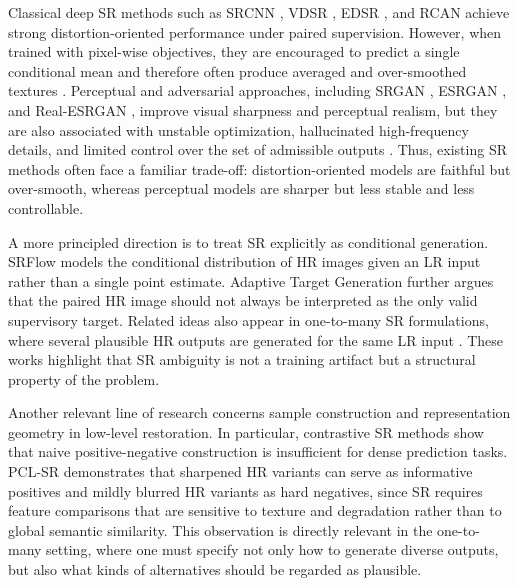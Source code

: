 \documentclass{article}
\begin{document}
Classical deep SR methods such as SRCNN \cite{dong2015srcnn}, VDSR \cite{kim2016vdsr}, EDSR \cite{lim2017edsr}, and RCAN \cite{zhang2018rcan} achieve strong distortion-oriented performance under paired supervision. However, when trained with pixel-wise objectives, they are encouraged to predict a single conditional mean and therefore often produce averaged and over-smoothed textures \cite{ledig2017srgan,wang2018esrgan,jo2021adatarget}. Perceptual and adversarial approaches, including SRGAN \cite{ledig2017srgan}, ESRGAN \cite{wang2018esrgan}, and Real-ESRGAN \cite{wang2021realesrgan}, improve visual sharpness and perceptual realism, but they are also associated with unstable optimization, hallucinated high-frequency details, and limited control over the set of admissible outputs \cite{wang2018esrgan,wang2021realesrgan}. Thus, existing SR methods often face a familiar trade-off: distortion-oriented models are faithful but over-smooth, whereas perceptual models are sharper but less stable and less controllable.

A more principled direction is to treat SR explicitly as conditional generation. SRFlow \cite{lugmayr2020srflow} models the conditional distribution of HR images given an LR input rather than a single point estimate. Adaptive Target Generation \cite{jo2021adatarget} further argues that the paired HR image should not always be interpreted as the only valid supervisory target. Related ideas also appear in one-to-many SR formulations, where several plausible HR outputs are generated for the same LR input \cite{park2021onetomanysr}. These works highlight that SR ambiguity is not a training artifact but a structural property of the problem.

Another relevant line of research concerns sample construction and representation geometry in low-level restoration. In particular, contrastive SR methods show that naive positive-negative construction is insufficient for dense prediction tasks. PCL-SR \cite{wu2021pclsr} demonstrates that sharpened HR variants can serve as informative positives and mildly blurred HR variants as hard negatives, since SR requires feature comparisons that are sensitive to texture and degradation rather than to global semantic similarity. This observation is directly relevant in the one-to-many setting, where one must specify not only how to generate diverse outputs, but also what kinds of alternatives should be regarded as plausible.
\end{document}
